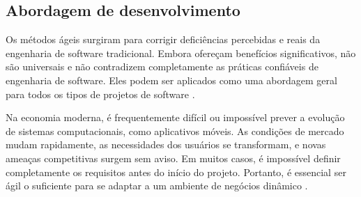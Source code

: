 
\subsection{Abordagem de desenvolvimento}


Os métodos ágeis surgiram para corrigir deficiências percebidas e reais da engenharia de software tradicional. Embora ofereçam benefícios significativos, não são universais e não contradizem completamente as práticas confiáveis de engenharia de software. Eles podem ser aplicados como uma abordagem geral para todos os tipos de projetos de software \cite{pressman}.

Na economia moderna, é frequentemente difícil ou impossível prever a evolução de sistemas computacionais, como aplicativos móveis. As condições de mercado mudam rapidamente, as necessidades dos usuários se transformam, e novas ameaças competitivas surgem sem aviso. Em muitos casos, é impossível definir completamente os requisitos antes do início do projeto. Portanto, é essencial ser ágil o suficiente para se adaptar a um ambiente de negócios dinâmico \cite{pressman}.

